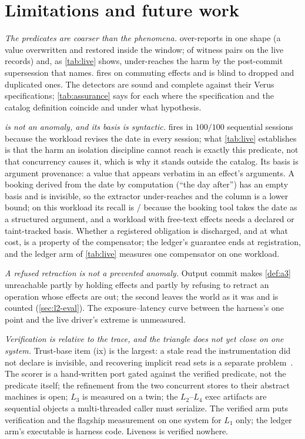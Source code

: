 \section{Limitations and future work}
\label{sec:limitations}

\noindent\emph{The predicates are coarser than the phenomena.} 
over-reports in one shape (a value overwritten and restored inside the
window; \HypRestored{} of \HypAOneWitnesses{} witness pairs on the live
records) and, as \cref{tab:live} shows, under-reaches the harm by the
post-commit supersession that \Rp{} names.  fires on commuting effects
and is blind to dropped and duplicated ones. The detectors are sound and
complete against their Verus specifications; \cref{tab:assurance} says for
each where the specification and the catalog definition coincide and under
what hypothesis.

\smallskip\noindent\emph{\Rp{} is not an anomaly, and its basis is
syntactic.} \Rp{} fires in $100/100$ sequential sessions because the
workload revises the date in every session; what \cref{tab:live}
establishes is that the harm an isolation discipline cannot reach is exactly
this predicate, not that concurrency causes it, which is why it stands
outside the catalog. Its basis is argument provenance: a value that appears
verbatim in an effect's arguments. A booking derived from the date by
computation (``the day after'') has an empty basis and is invisible, so the
extractor under-reaches and the \Rp{} column is a lower bound; on this
workload its recall is \HypBasisRecovered/\HypBookings{} because the booking
tool takes the date as a structured argument, and a workload with free-text
effects needs a declared or taint-tracked basis. Whether a registered
obligation is discharged, and at what cost, is a property of the
compensator; the ledger's guarantee ends at registration, and the ledger arm
of \cref{tab:live} measures one compensator on one workload.

\smallskip\noindent\emph{A refused retraction is not a prevented anomaly.}
Output commit makes \cref{def:a3} unreachable partly by holding effects and
partly by refusing to retract an operation whose effects are out; the second
leaves the world as it was and is counted (\cref{sec:l2-eval}). The
exposure--latency curve between the harness's one point and the live
driver's extreme is unmeasured.

\smallskip\noindent\emph{Verification is relative to the trace, and the
triangle does not yet close on one system.} Trust-base item (ix) is the
largest: a stale read the instrumentation did not declare is invisible, and
recovering implicit read sets is a separate problem~\cite{Khan2026SBus}. The
scorer is a hand-written port gated against the verified predicate, not the
predicate itself; the refinement from the two concurrent stores to their
abstract machines is open; $L_3$ is measured on a twin; the $L_2$--$L_4$
exec artifacts are sequential objects a multi-threaded caller must
serialize. The verified arm puts verification and the flagship measurement
on one system for $L_1$ only; the ledger arm's executable is harness code.
Liveness is verified nowhere.

